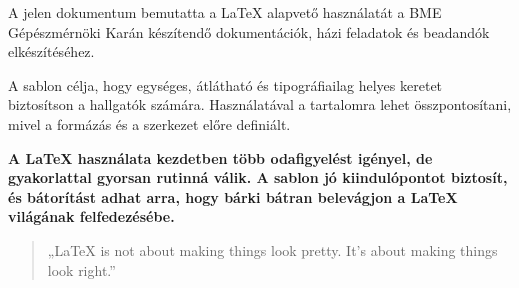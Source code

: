 \documentclass[fleqn,12pt]{article}
\begin{document}
    A jelen dokumentum bemutatta a \LaTeX{} alapvető használatát a BME
    Gépészmérnöki Karán készítendő dokumentációk, házi feladatok és
    beadandók elkészítéséhez. 
    
    \vspace{0.5em}
    A sablon célja, hogy egységes, átlátható és tipográfiailag helyes keretet biztosítson a hallgatók számára. Használatával a tartalomra lehet összpontosítani, mivel a formázás és a szerkezet előre definiált.

    \medskip
    \textbf{A \LaTeX{} használata kezdetben több odafigyelést igényel, de gyakorlattal gyorsan rutinná válik. A sablon jó kiindulópontot biztosít, és bátorítást adhat arra, hogy bárki bátran belevágjon a \LaTeX{} világának felfedezésébe.}

    \begin{quote}
        „\LaTeX{} is not about making things look pretty. It's about making things look right.”  
    \end{quote}






\end{document}
